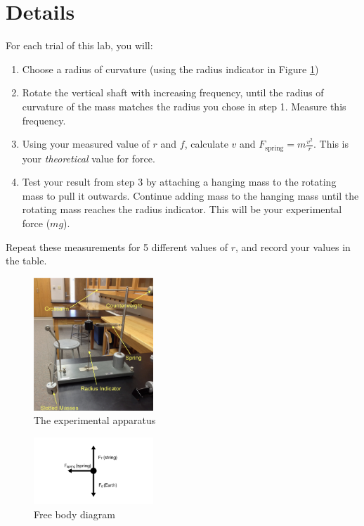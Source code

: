 \documentclass{article}
\begin{document}
\section*{Details}
For each trial of this lab, you will:
\begin{enumerate}
	\item Choose a radius of curvature (using the radius indicator in Figure \ref{exp})
	\item Rotate the vertical shaft with increasing frequency, until the radius of curvature of the mass matches the radius you chose in step 1. Measure this frequency.
	\item Using your measured value of $r$ and $f$, calculate $v$ and $F_\mathrm{spring}=m\frac{v^2}{r}$. This is your \textit{theoretical} value for force.
	\item Test your result from step 3 by attaching a hanging mass to the rotating mass to pull it outwards. Continue adding mass to the hanging mass until the rotating mass reaches the radius indicator. This will be your experimental force ($mg$).
\end{enumerate}
Repeat these measurements for 5 different values of $r$, and record your values in the table.
\begin{figure}[ht!]
	\centering
	\includegraphics[width=0.4\textwidth]{centripetal.png}
	\caption{The experimental apparatus}
	\label{exp}
\end{figure}

\begin{figure}[ht!]
	\centering
	\includegraphics[width=0.4\textwidth]{fbd.pdf}
	\caption{Free body diagram}
	\label{fbd}
\end{figure}
\end{document}
